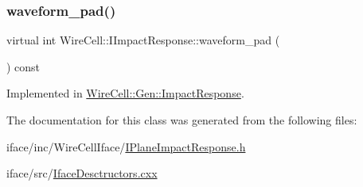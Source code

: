 \subsubsection{\texorpdfstring{waveform\+\_\+pad()}{waveform\_pad()}}
{\footnotesize\ttfamily virtual int Wire\+Cell\+::\+I\+Impact\+Response\+::waveform\+\_\+pad (\begin{DoxyParamCaption}{ }\end{DoxyParamCaption}) const\hspace{0.3cm}{\ttfamily [pure virtual]}}



Implemented in \hyperlink{class_wire_cell_1_1_gen_1_1_impact_response_a11a5437cb671e68e35244757d92dda56}{Wire\+Cell\+::\+Gen\+::\+Impact\+Response}.



The documentation for this class was generated from the following files\+:\begin{DoxyCompactItemize}
\item 
iface/inc/\+Wire\+Cell\+Iface/\hyperlink{_i_plane_impact_response_8h}{I\+Plane\+Impact\+Response.\+h}\item 
iface/src/\hyperlink{_iface_desctructors_8cxx}{Iface\+Desctructors.\+cxx}\end{DoxyCompactItemize}
